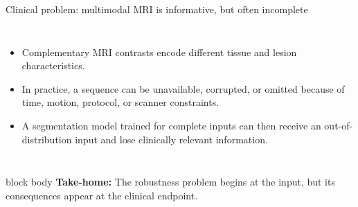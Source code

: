 \documentclass[aspectratio=169,11pt]{beamer}
\newcommand{\takeaway}[1]{%
  \vfill
  \begin{beamercolorbox}[rounded=true,sep=0.7ex,leftskip=0.8ex]{block body}%
    \textbf{Take-home:} #1
  \end{beamercolorbox}%
}
\begin{document}
\begin{frame}{Clinical problem: multimodal MRI is informative, but often incomplete}
  \begin{columns}[T,onlytextwidth]
      \begin{itemize}
        \item Complementary MRI contrasts encode different tissue and lesion characteristics.
        \item In practice, a sequence can be unavailable, corrupted, or omitted because of time,
              motion, protocol, or scanner constraints.
        \item A segmentation model trained for complete inputs can then receive an out-of-distribution
              input and lose clinically relevant information.
      \end{itemize}
  \end{columns}
  \takeaway{The robustness problem begins at the input, but its consequences appear at the clinical endpoint.}
\end{frame}
\end{document}
